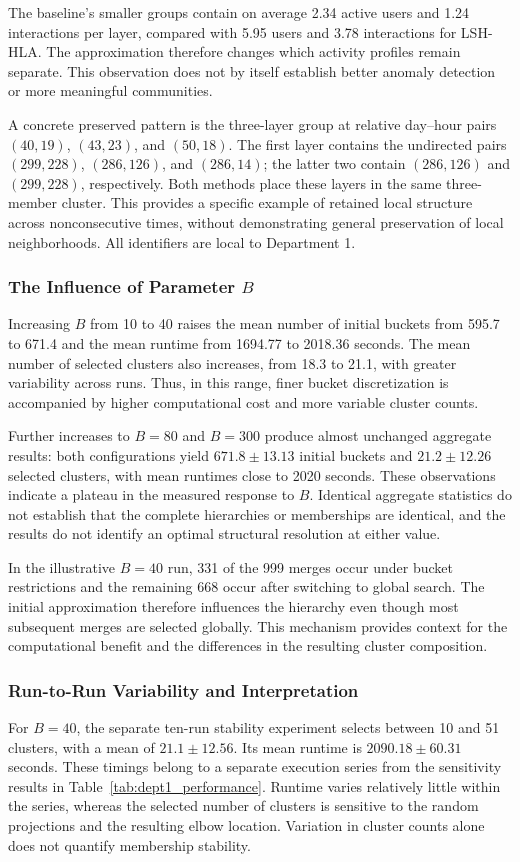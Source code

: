The baseline's smaller groups contain on average 2.34 active users and 1.24 interactions per layer, compared with 5.95 users and 3.78 interactions for LSH-HLA. The approximation therefore changes which activity profiles remain separate. This observation does not by itself establish better anomaly detection or more meaningful communities.

A concrete preserved pattern is the three-layer group at relative day--hour pairs $(40,19)$, $(43,23)$, and $(50,18)$. The first layer contains the undirected pairs $(299,228)$, $(286,126)$, and $(286,14)$; the latter two contain $(286,126)$ and $(299,228)$, respectively. Both methods place these layers in the same three-member cluster. This provides a specific example of retained local structure across nonconsecutive times, without demonstrating general preservation of local neighborhoods. All identifiers are local to Department 1.

\subsubsection*{The Influence of Parameter $B$}
Increasing $B$ from 10 to 40 raises the mean number of initial buckets from 595.7 to 671.4 and the mean runtime from 1694.77 to 2018.36 seconds. The mean number of selected clusters also increases, from 18.3 to 21.1, with greater variability across runs. Thus, in this range, finer bucket discretization is accompanied by higher computational cost and more variable cluster counts.

Further increases to $B=80$ and $B=300$ produce almost unchanged aggregate results: both configurations yield $671.8\pm13.13$ initial buckets and $21.2\pm12.26$ selected clusters, with mean runtimes close to 2020 seconds. These observations indicate a plateau in the measured response to $B$. Identical aggregate statistics do not establish that the complete hierarchies or memberships are identical, and the results do not identify an optimal structural resolution at either value.

In the illustrative $B=40$ run, 331 of the 999 merges occur under bucket restrictions and the remaining 668 occur after switching to global search. The initial approximation therefore influences the hierarchy even though most subsequent merges are selected globally. This mechanism provides context for the computational benefit and the differences in the resulting cluster composition.

\subsubsection*{Run-to-Run Variability and Interpretation}
For $B=40$, the separate ten-run stability experiment selects between 10 and 51 clusters, with a mean of $21.1\pm12.56$. Its mean runtime is $2090.18\pm60.31$ seconds. These timings belong to a separate execution series from the sensitivity results in Table~\ref{tab:dept1_performance}. Runtime varies relatively little within the series, whereas the selected number of clusters is sensitive to the random projections and the resulting elbow location. Variation in cluster counts alone does not quantify membership stability.

